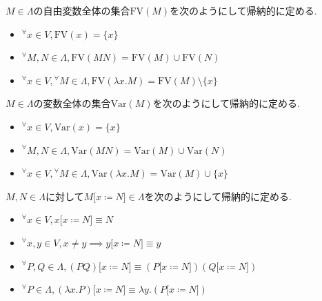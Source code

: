 \begin{definition}
$M \in \Lambda$の自由変数全体の集合$\textrm{FV}(M)$を次のようにして帰納的に定める.
\begin{itemize}
    \item ${^{\forall}}x \in V, \textrm{FV}(x) = \{x\}$
    \item ${^{\forall}}M, N \in \Lambda, \textrm{FV}(M N) = \textrm{FV}(M) \cup \textrm{FV}(N)$
    \item ${^{\forall}}x \in V, {^{\forall}}M \in \Lambda, \textrm{FV}(\lambda x.M) = \textrm{FV}(M) \setminus \{x\}$
\end{itemize}
\end{definition}

\begin{definition}
$M \in \Lambda$の変数全体の集合$\textrm{Var}(M)$を次のようにして帰納的に定める.
\begin{itemize}
    \item ${^{\forall}}x \in V, \textrm{Var}(x) = \{x\}$
    \item ${^{\forall}}M, N \in \Lambda, \textrm{Var}(M N) = \textrm{Var}(M) \cup \textrm{Var}(N)$
    \item ${^{\forall}}x \in V, {^{\forall}}M \in \Lambda, \textrm{Var}(\lambda x.M) = \textrm{Var}(M) \cup \{x\}$
\end{itemize}
\end{definition}

\begin{definition}
$M, N \in \Lambda$に対して$M \lbrack x \coloneq N \rbrack \in \Lambda$を次のようにして帰納的に定める.
\begin{itemize}
    \item ${^{\forall}}x \in V, x \lbrack x \coloneq N \rbrack \equiv N$
    \item ${^{\forall}}x,y \in V, x \neq y \implies y \lbrack x \coloneq N \rbrack \equiv y$
    \item ${^{\forall}}P,Q \in \Lambda, (PQ) \lbrack x \coloneq N \rbrack \equiv (P \lbrack x \coloneq N \rbrack)(Q \lbrack x \coloneq N \rbrack)$
    \item ${^{\forall}}P \in \Lambda, (\lambda x.P) \lbrack x \coloneq N \rbrack \equiv \lambda y.(P \lbrack x \coloneq N \rbrack)$
\end{itemize}
\end{definition}

